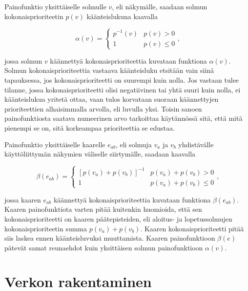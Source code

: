   Painofunktio yksittäiselle solmulle \(v\), eli näkymälle, saadaan solmun kokonaisprioriteetin \(p(v)\) käänteislukuna kaavalla

  \begin{equation} \label{eq:5_4_2}
    \alpha(v) = \begin{cases}
      p^{-1}(v) & p(v) > 0 \\
      1 & p(v) \leq 0
    \end{cases}
    \text{,}
  \end{equation}

  jossa solmun \(v\) käännettyä kokonaisprioriteettia kuvataan funktiona \(\alpha(v)\).
  Solmun kokonaisprioriteettia vastaava käänteisluku etsitään vain siinä tapauksessa, jos kokonaisprioriteetti on suurempi kuin nolla.
  Jos vastaan tulee tilanne, jossa kokonaisprioriteetti olisi negatiivinen tai yhtä suuri kuin nolla, ei käänteislukua yritetä ottaa, vaan tulos korvataan suoraan käännettyjen prioriteettien alhaisimmalla arvolla, eli luvulla yksi.
  Toisin sanoen painofunktiosta saatava numeerinen arvo tarkoittaa käytännössä sitä, että mitä pienempi se on, sitä korkeampaa prioriteettia se edustaa.

  Painofunktio yksittäiselle kaarelle \(e_{ab}\), eli solmuja \(v_a\) ja \(v_b\) yhdistävälle käyttöliittymän näkymien väliselle siirtymälle, saadaan kaavalla

  \begin{equation} \label{eq:5_4_3}
    \beta(e_{ab}) = \begin{cases}
      [p(v_a) + p(v_b)]^{-1} & p(v_a) + p(v_b) > 0 \\
      1 & p(v_a) + p(v_b) \leq 0
    \end{cases}
    \text{,}
  \end{equation}

  jossa kaaren \(e_{ab}\) käännettyä kokonaisprioriteettia kuvataan funktiona \(\beta(e_{ab})\). Kaaren painofunktiota varten pitää kuitenkin huomioida, että sen kokonaisprioriteetti on kaaren päätepisteiden, eli aloitus- ja lopetussolmujen kokonaisprioriteetin summa \(p(v_a) + p(v_b)\).
  Kaaren kokonaisprioriteetti pitää siis laskea ennen käänteisluvuksi muuttamista.
  Kaaren painofunktioon \(\beta(e)\) pätevät samat reunaehdot kuin yksittäisen solmun painofunktioon \(\alpha(v)\).

\section{Verkon rakentaminen} \label{ch:10_verkon_rakentaminen}

